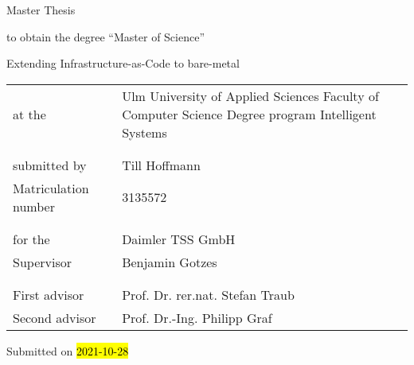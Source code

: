 \begin{titlepage}
  \vspace*{4cm}

  {\normalfont\sffamily\huge Master Thesis}

  \vspace{0.5cm}
  to obtain the degree \enquote{Master of Science}

  \vspace{2.0cm}
  {\normalfont\sffamily\large Extending Infrastructure-as-Code to bare-metal}

  \bigskip

  \begin{tabular}{ @{} p{} p{} }
      at the & Ulm University of Applied Sciences
      \newline
      Faculty of Computer Science
      \newline
      Degree program Intelligent Systems  \\
      & \\
      & \\
      submitted by & Till Hoffmann \\
      Matriculation number & 3135572 \\
      & \\
      & \\
      for the & Daimler TSS GmbH \\
      Supervisor & Benjamin Gotzes \\
      & \\
      & \\
      First advisor & Prof. Dr. rer.nat. Stefan Traub \\
      Second advisor & Prof. Dr.-Ing. Philipp Graf \\
  \end{tabular}

  \vspace{1cm}
  
  Submitted on \hl{2021-10-28}

\end{titlepage}
